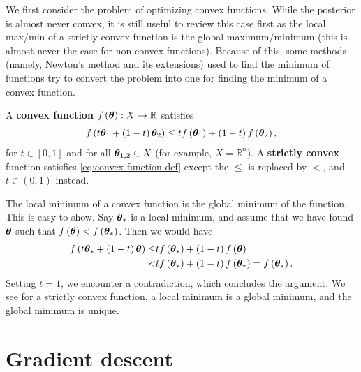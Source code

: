 We first consider the problem of optimizing convex functions. 
While the posterior is almost never convex, it is still useful to review this case first
as the local max/min of a strictly convex function is the global maximum/minimum
(this is almost never the case for non-convex functions).
Because of this, 
some methods (namely, Newton's method and its extensions)
used to find the minimum of functions try to convert the problem
into one for finding the minimum of a convex function.

A \textbf{convex function} $f\left({\bm \theta}\right):X\to\mathbb{R}$ satisfies
\begin{align}
    \label{eq:convex-function-def}
    f\left(t {\bm \theta}_1 + \left(1-t\right){\bm \theta}_2\right)
    \leq 
    t f\left({\bm \theta}_1\right)
    +
    \left(1-t\right)f\left({\bm \theta}_2\right)
    ,
\end{align}
for $t\in\left[0,1\right]$ and for all ${\bm \theta}_{1,2}\in X$
(for example, $X=\mathbb{R}^n$).
A \textbf{strictly convex} function satisfies \eqref{eq:convex-function-def}
except the $\leq$ is replaced by $<$, and $t\in\left(0,1\right)$ instead.

The local minimum of a convex function is the global minimum of the function.
This is easy to show. Say ${\bm \theta}_*$ is a local minimum, and assume that
we have found ${\bm \theta}$ such that $f\left({\bm \theta}\right)<f\left({\bm \theta}_*\right)$.
Then we would have
\begin{align}
    \label{eq:convex-function-def}
    f\left(t {\bm \theta}_* + \left(1-t\right){\bm \theta}\right)
    \leq& 
    t f\left({\bm \theta}_*\right)
    +
    \left(1-t\right)f\left({\bm \theta}\right)
    \nonumber\\
    <& 
    t f\left({\bm \theta}_*\right)
    +
    \left(1-t\right)f\left({\bm \theta}_*\right)
    =
    f\left({\bm \theta}_*\right)
    .
\end{align}
Setting $t=1$, we encounter a contradiction, which concludes the argument.
We see for a strictly convex function, a local minimum is a global minimum,
and the global minimum is unique.

\section{Gradient descent\label{sec:gradient-descent}}

